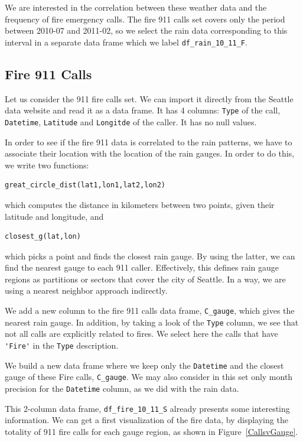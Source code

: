 \documentclass[12pt,a4paper]{article}
\begin{document}
We are interested in the correlation between these weather data and the frequency of fire emergency calls. The fire 911 calls set covers only the period between 2010-07 and 2011-02, so we select the rain data corresponding to this interval in a separate data frame which we label \verb|df_rain_10_11_F|.

\subsection{Fire 911 Calls}

Let us consider the 911 fire calls set. We can import it directly from the Seattle data website and read it as a data frame. It has 4 columns: \verb|Type| of the call, \verb|Datetime|, \verb|Latitude| and \verb|Longitde| of the caller. It has no null values.

In order to see if the fire 911 data is correlated to the rain patterns, we have to associate their location with the location of the rain gauges. In order to do this, we write two functions:

\begin{verbatim}
great_circle_dist(lat1,lon1,lat2,lon2) 
\end{verbatim}

which computes the distance in kilometers between two points, given their latitude and longitude, and

\begin{verbatim}
closest_g(lat,lon) 
\end{verbatim}

which picks a point and finds the closest rain gauge. By using the latter, we can find the nearest gauge to each 911 caller. Effectively, this defines rain gauge regions as partitions or sectors that cover the city of Seattle. In a way, we are using a nearest neighbor approach indirectly. 

We add a new column to the fire 911 calls data frame, \verb|C_gauge|, which gives the nearest rain gauge. In addition, by taking a look of the \verb|Type| column, we see that not all calls are explicitly related to fires. We select here the calls that have \verb|'Fire'| in the \verb|Type| description.

We build a new data frame where we keep only the \verb|Datetime| and the closest gauge of these Fire calls, \verb|C_gauge|. We may also consider in this set only month precision for the \verb|Datetime| column, as we did with the rain data.

This 2-column data frame, \verb|df_fire_10_11_S| already presents some interesting information. We can get a first visualization of the fire data, by displaying the totality of 911 fire calls for each gauge region, as shown in Figure~\ref{CallsvGauge}.
\end{document}
